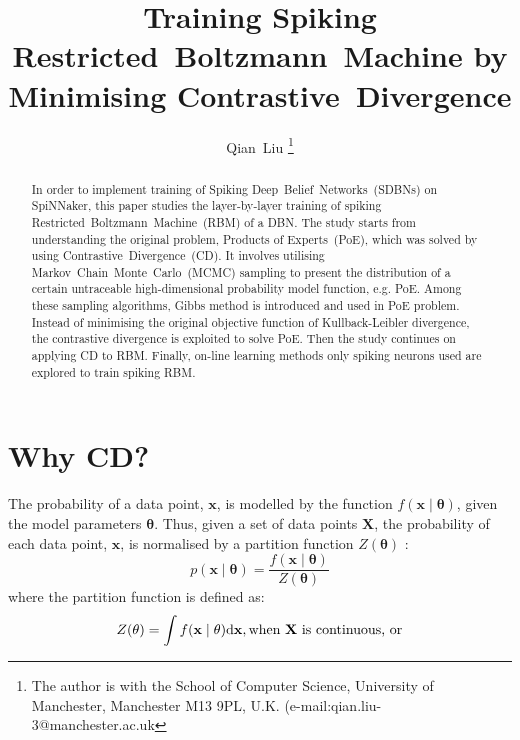 \documentclass[11pt,twoside,a4paper]{article}
\def\D{\mathrm{d}}
\begin{document}
\title{Training Spiking Restricted~Boltzmann~Machine by Minimising Contrastive~Divergence}
\author{
Qian~Liu
\thanks{
The author is with the School of Computer Science, University of Manchester, Manchester M13 9PL, U.K. 
(e-mail:qian.liu-3@manchester.ac.uk}
}
\maketitle
\thispagestyle{empty}

\begin{abstract}
In order to implement training of Spiking Deep~Belief~Networks~(SDBNs) on SpiNNaker, this paper studies the layer-by-layer training of spiking Restricted~Boltzmann~Machine~(RBM) of a DBN.
The study starts from understanding the original problem, Products of Experts~(PoE), which was solved by using Contrastive~Divergence~(CD).
It involves utilising Markov~Chain~Monte~Carlo~(MCMC) sampling to present the distribution of a certain untraceable high-dimensional probability model function, e.g. PoE.
Among these sampling algorithms, Gibbs method is introduced and used in PoE problem.
Instead of minimising the original objective function of Kullback-Leibler divergence, the contrastive divergence is exploited to solve PoE.
Then the study continues on applying CD to RBM.
Finally, on-line learning methods only spiking neurons used are explored to train spiking RBM.

\end{abstract}
\section{Why CD?\cite{hinton2002training,woodfordnotes}}
The probability of a data point, $ \mathbf{x} $,  is modelled by the function $f(\mathbf{x} \mid \mathbf{\theta} )$, given the model parameters $ \mathbf{\theta} $. 
Thus, given a set of data points $ \mathbf{X} $, the probability of each data point,  $ \mathbf{x} $, is normalised by a partition function $Z( \mathbf{\theta})$ :
\begin{equation}
p(\mathbf{x} \mid \mathbf{\theta} ) = \dfrac{f(\mathbf{x} \mid \mathbf{\theta} )}{Z( \mathbf{\theta})}
\end{equation}
where the partition function is defined as:
\begin{equation}
Z( \mathbf{\theta}) = \int f(\mathbf{x} \mid \mathbf{\theta} )\D\mathbf{x}, \text{when  $ \mathbf{X} $ is continuous, or}
\end{equation}
\end{document}
